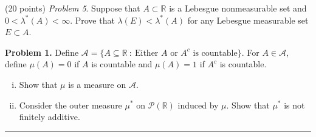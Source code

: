 \documentclass[leqno]{article}
\theoremstyle{nonumberplain}
\newcommand{\R}{\mathbb{R}}
\begin{document}
\bigskip
\bigskip
\noindent
(20 points) \textit{Problem 5}. \quad
Suppose that $A\subset \R$ is a Lebesgue nonmeasurable set and $0<\lambda^*(A)<\infty$. Prove that $\lambda(E)<\lambda^*(A)$ for any Lebesgue measurable set $E\subset A$.



\pagebreak


\noindent\textbf{Problem 1.} \quad
Define $\mathcal{A}=\{A\subseteq \R ~\colon~ \textrm{Either $A$ or $A^c$ is countable}\}$. For $A\in \mathcal{A}$, define $\mu(A)=0$ if $A$ is countable and $\mu(A)=1$ if $A^c$ is countable.
\begin{enumerate}[(i)]
\item Show that $\mu$ is a measure on $\mathcal{A}$.
\item Consider the outer measure $\mu^*$ on $\mathcal{P}(\R)$ induced by $\mu$. Show that $\mu^*$ is not finitely additive.
\end{enumerate}

\noindent\rule[0.5ex]{\linewidth}{1pt}
\end{document}
